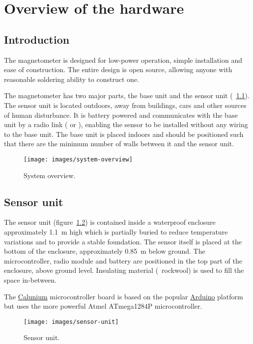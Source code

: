 \chapter{Overview of the hardware}

\section{Introduction}
The magnetometer is designed for low-power operation, simple
installation and ease of construction. The entire design is open
source, allowing anyone with reasonable soldering ability to construct
one.

The magnetometer has two major parts, the base unit and the sensor
unit (\figurename~\ref{fig:system-overview}). The sensor unit is located
outdoors, away from buildings, cars and other sources of human
disturbance. It is battery powered and communicates with the base unit
by a radio link ( or ), enabling the sensor to be
installed without any wiring to the base unit. The base unit is placed
indoors and should be positioned such that there are the minimum
number of walls between it and the sensor unit.

\begin{figure}
  \centering
  \texttt{[image: images/system-overview]}
  \caption[System overview]%
  {System overview.}
  \label{fig:system-overview}
\end{figure}

\section{Sensor unit}

The sensor unit (figure~\ref{fig:sensor-unit}) is contained inside a
waterproof enclosure approximately \SI{1.1}{\metre} high which is
partially buried to reduce temperature variations and to provide a
stable foundation. The sensor itself is placed at the bottom of the
enclosure, approximately \SI{0.85}{\metre} below ground. The
microcontroller, radio module and battery are positioned in the top
part of the enclosure, above ground level. Insulating material (\eg\
rockwool) is used to fill the space in-between.

The
\href{http://blog.stevemarple.co.uk/search/label/Calunium}{Calunium}
microcontroller board is based on the popular
\href{http://arduino.cc}{Arduino} platform but uses the more powerful
Atmel ATmega1284P microcontroller.

\begin{figure}[!h]
  \centering
  \texttt{[image: images/sensor-unit]}
  \caption[Sensor unit]{%
    Sensor unit.  
  }
  \label{fig:sensor-unit}
\end{figure}

